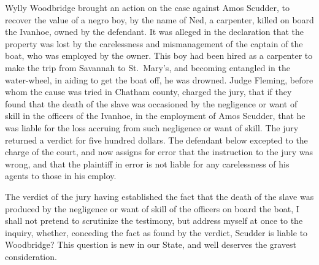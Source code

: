 \documentclass[
  letterpaper,
  11pt,
  DIV=9,
  openright]{scrbook}
\begin{document}

Wylly Woodbridge brought an action on the case against Amos Scudder, to
recover the value of a negro boy, by the name of Ned, a carpenter,
killed on board the Ivanhoe, owned by the defendant. It was alleged in
the declaration that the property was lost by the carelessness and
mismanagement of the captain of the boat, who was employed by the owner.
This boy had been hired as a carpenter to make the trip from Savannah to
St.~Mary's, and becoming entangled in the water-wheel, in aiding to get
the boat off, he was drowned. Judge Fleming, before whom the cause was
tried in Chatham county, charged the jury, that if they found that the
death of the slave was occasioned by the negligence or want of skill in
the officers of the Ivanhoe, in the employment of Amos Scudder, that he
was liable for the loss accruing from such negligence or want of skill.
The jury returned a verdict for five hundred dollars. The defendant
below excepted to the charge of the court, and now assigns for error
that the instruction to the jury was wrong, and that the plaintiff in
error is not liable for any carelessness of his agents to those in his
employ.

The verdict of the jury having established the fact that the death of
the slave was produced by the negligence or want of skill of the
officers on board the boat, I shall not pretend to scrutinize the
testimony, but address myself at once to the inquiry, whether, conceding
the fact as found by the verdict, Scudder is liable to Woodbridge? This
question is new in our State, and well deserves the gravest
consideration.

\end{document}
